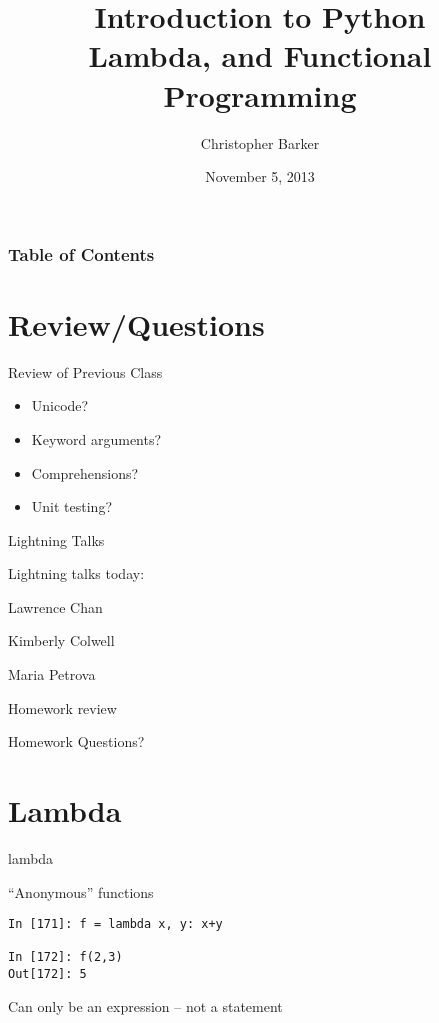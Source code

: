 \documentclass{beamer}
\title[Intro to Python: Week 1]{Introduction  to Python\\
Lambda, and Functional Programming}
\author{Christopher Barker}
\institute{UW Continuing Education}
\date{November 5, 2013}
\begin{document}
\begin{frame}
  \titlepage
\end{frame}

\begin{frame}
\frametitle{Table of Contents}
  \tableofcontents
\end{frame}


\section{Review/Questions}

\begin{frame}{Review of Previous Class}

\begin{itemize}
  \item Unicode?
  \item Keyword arguments?
  \item Comprehensions?
  \item Unit testing?
\end{itemize}

\end{frame}


\begin{frame}{Lightning Talks}

\vfill
{\LARGE Lightning talks today:}

\vfill
{\Large
Lawrence Chan

\vfill
Kimberly Colwell

\vfill
Maria Petrova


}
\vfill

\end{frame}


\begin{frame}{Homework review}

  \vfill
  {\Large Homework Questions? }

  \vfill

\end{frame}

\section{Lambda}

\begin{frame}[fragile]{lambda}

{\Large``Anonymous'' functions}

\vfill
\begin{verbatim}
In [171]: f = lambda x, y: x+y

In [172]: f(2,3)
Out[172]: 5
\end{verbatim}

\vfill
{\Large Can only be an expression -- not a statement}

\end{frame} 
\end{document}
